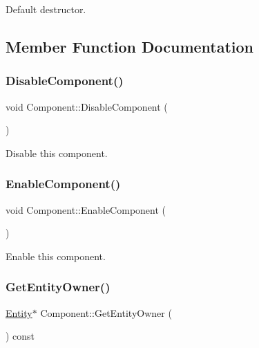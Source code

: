 Default destructor. 

\subsection{Member Function Documentation}
\mbox{\label{class_component_abe8c32edb2ca2b367223ed1f183dc512}} 
\subsubsection{\texorpdfstring{Disable\+Component()}{DisableComponent()}}
{\footnotesize\ttfamily void Component\+::\+Disable\+Component (\begin{DoxyParamCaption}{ }\end{DoxyParamCaption})}

Disable this component. \mbox{\label{class_component_adccde1de0f593815f081c7df620becbe}} 
\subsubsection{\texorpdfstring{Enable\+Component()}{EnableComponent()}}
{\footnotesize\ttfamily void Component\+::\+Enable\+Component (\begin{DoxyParamCaption}{ }\end{DoxyParamCaption})}

Enable this component. \mbox{\label{class_component_a7bd8639dadfcaef6baaff8c3b17ae5e6}} 
\subsubsection{\texorpdfstring{Get\+Entity\+Owner()}{GetEntityOwner()}}
{\footnotesize\ttfamily \mbox{\hyperlink{class_entity}{Entity}}$\ast$ Component\+::\+Get\+Entity\+Owner (\begin{DoxyParamCaption}{ }\end{DoxyParamCaption}) const\hspace{0.3cm}{\ttfamily [inline]}}

